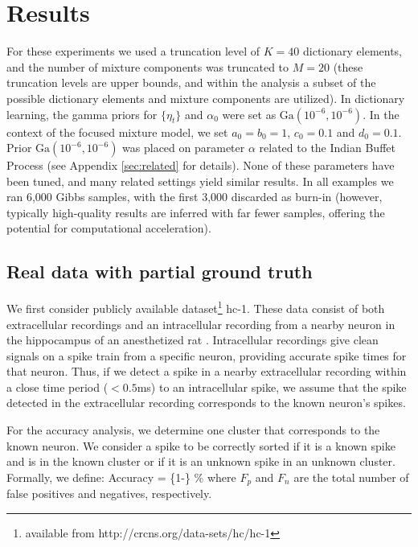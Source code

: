 \documentclass[journal]{IEEEtran}
\begin{document}

\section{Results\label{sec:results}}

For these experiments we used a truncation level of
$K=40$ dictionary elements, and the number of mixture components was
truncated to $M=20$ (these truncation levels are upper bounds, and within the analysis a subset of the possible dictionary elements and mixture components are utilized).  In dictionary learning, the gamma priors for
$\{\eta_t\}$ and $\alpha_0$ were set as
$\mbox{Ga}(10^{-6},10^{-6})$. In the context of the {focused mixture model}, we set $a_0=b_0=1$, $c_0=0.1$ and
$d_0=0.1$. Prior $\mbox{Ga}(10^{-6},10^{-6})$ was placed on
parameter $\alpha$ related to the {Indian Buffet Process (see Appendix}  \ref{sec:related} {for details)}. None of these parameters have
been tuned, and many related settings yield similar results. In all
examples we ran 6,000 Gibbs samples, with the first 3,000 discarded
as burn-in (however, typically high-quality results are inferred with far fewer samples, offering the potential for computational acceleration).

\subsection{Real data with partial ground truth} 
\label{sec:truth}
We
first consider publicly available dataset\footnote{available from
http://crcns.org/data-sets/hc/hc-1} hc-1. These data consist of both
extracellular recordings and an intracellular recording from a
nearby neuron in the hippocampus of an anesthetized rat
\cite{Henze2000}.  Intracellular recordings give clean signals on a
spike train from a specific neuron, providing accurate spike times for
that neuron.  Thus, if we detect a spike in a nearby extracellular
recording within a close time period ($<0.5$ms) to an intracellular
spike, we assume that the spike detected in the extracellular
recording corresponds to the known neuron's spikes.

For the accuracy analysis, we determine one cluster that corresponds to the
known neuron.  We consider a spike to be correctly sorted if
it is a known spike and is in the known cluster or if it is an
unknown spike in {an} unknown cluster. 
{Formally, we define:}
\beq
\mbox{Accuracy} = \left\{1-\right\} \%
\eeq
{where $F_p$ and $F_n$ are the total number of false positives and negatives, respectively.}
\end{document}
